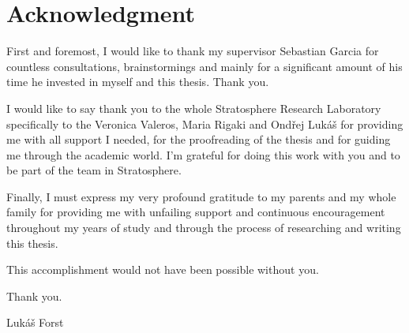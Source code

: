 \vspace*{\fill}

\section*{Acknowledgment}
First and foremost, I would like to thank my supervisor Sebastian Garcia for countless consultations, brainstormings and mainly for a significant amount of his time he invested in myself and this thesis. Thank you.

I would like to say thank you to the whole Stratosphere Research Laboratory specifically to the Veronica Valeros, Maria Rigaki and Ondřej Lukáš for providing me with all support I needed, for the proofreading of the thesis and for guiding me through the academic world.
I'm grateful for doing this work with you and to be part of the team in Stratosphere.

Finally, I must express my very profound gratitude to my parents and my whole family for providing me with unfailing support and continuous encouragement throughout my years of study and through the process of researching and writing this thesis. 

\bigskip \noindent
This accomplishment would not have been possible without you.
  
\bigskip \noindent
Thank you.
  
\bigskip \noindent
\hspace*{\fill} Lukáš Forst

\thispagestyle{empty}

\cleardoublepage